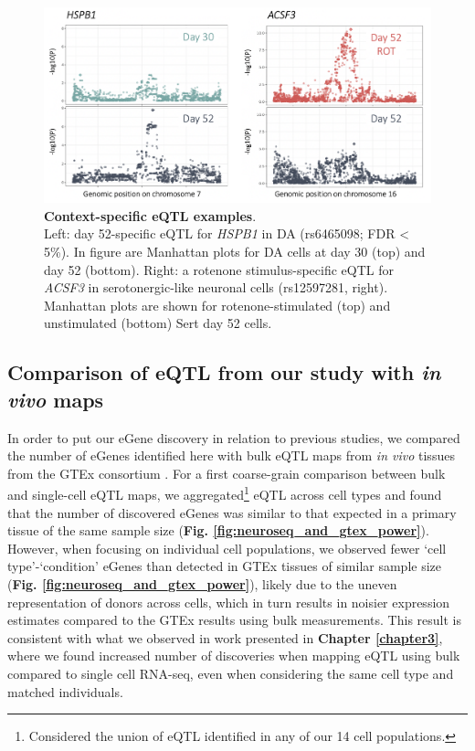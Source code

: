 \begin{figure}[h]
\includegraphics[width=16cm]{Chapter5/Fig/neuroseq_eqtl_examples.png}
\caption[Context-specific eQTL examples]{\textbf{Context-specific eQTL examples}.\\
Left: day 52-specific eQTL for \textit{HSPB1} in DA (rs6465098; FDR < 5\%). 
In figure are Manhattan plots for DA cells at day 30 (top) and day 52 (bottom). 
Right: a rotenone stimulus-specific eQTL for \textit{ACSF3} in serotonergic-like neuronal cells (rs12597281, right). 
Manhattan plots are shown for rotenone-stimulated (top) and unstimulated (bottom) Sert day 52 cells.}
\label{fig:neuroseq_eqtl_examples}
\end{figure}

\clearpage

\subsection{Comparison of eQTL from our study with \textit{in vivo} maps}

In order to put our eGene discovery in relation to previous studies, we compared the number of eGenes identified here with bulk eQTL maps from \textit{in vivo} tissues from the GTEx consortium \cite{gtex2017genetic}. 
For a first coarse-grain comparison between bulk and single-cell eQTL maps,
we aggregated\footnote{Considered the union of eQTL identified in any of our 14 cell populations.} eQTL across cell types and found that the number of discovered eGenes was similar to that expected in a primary tissue of the same sample size (\textbf{Fig. \ref{fig:neuroseq_and_gtex_power}}). \\

However, when focusing on individual cell populations, we observed fewer `cell type'-`condition' eGenes than detected in GTEx tissues of similar sample size (\textbf{Fig. \ref{fig:neuroseq_and_gtex_power}}), likely due to the uneven representation of donors across cells, which in turn results in noisier expression estimates compared to the GTEx results using bulk measurements.
This result is consistent with what we observed in work presented in \textbf{Chapter \ref{chapter3}}, where we found increased number of discoveries when mapping eQTL using bulk compared to single cell RNA-seq, even when considering the same cell type and matched individuals. 

